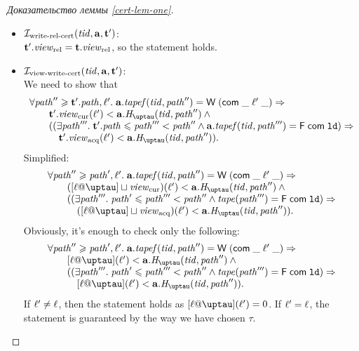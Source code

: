 \begin{proof}[Доказательство леммы \ref{cert-lem-one}]
\begin{itemize}
\begin{itemize}
        \item $\mathcal{I}_{\textup{\rm write-rel-cert}}(\mathit{tid}, \mathbf{a}, \mathbf{t}')$: \\
          $\mathbf{t}'.\mathit{view}_{\mathrm{rel}} = \mathbf{t}.\mathit{view}_{\mathrm{rel}}$, so the statement holds.

        \item $\mathcal{I}_{\textup{\rm view-write-cert}}(\mathit{tid}, \mathbf{a}, \mathbf{t}')$: \\
          We need to show that
          \[\begin{array}{l}
            \forall \cpath'' \ge \tT'.\cpath, \loc'. \;
              \aT.\tapef(\tId, \cpath'') = \tapeWrite{(\tapeWriteCommitted{\_}{\loc'}{\_})} \Rightarrow \\
          \quad \quad \tT'.\Rcur(\loc') < \aT.\tmap(\tId, \cpath'') \land {} \\
          \quad \quad ((\exists \cpath'''. \; \tT'.\cpath \le \cpath''' < \cpath'' \land 
                       \aT.\tapef(\tId, \cpath''') = \tapeFence{\Committed}{\LD}) \Rightarrow \\
          \quad \quad \quad \tT'.\Racq(\loc') < \aT.\tmap(\tId, \cpath'')).\\
          \end{array}\]
          Simplified:
          \[\begin{array}{l}
            \forall \cpath'' \ge \cpath', \loc'. \;
              \aT.\tapef(\tId, \cpath'') = \tapeWrite{(\tapeWriteCommitted{\_}{\loc'}{\_})} \Rightarrow \\
          \quad \quad ([\loc @ \tau] \sqcup \Rcur)(\loc') < \aT.\tmap(\tId, \cpath'') \land {} \\
          \quad \quad ((\exists \cpath'''. \; \cpath' \le \cpath''' < \cpath'' \land 
                       \tape(\cpath''') = \tapeFence{\Committed}{\LD}) \Rightarrow \\
          \quad \quad \quad ([\loc @ \tau] \sqcup \Racq)(\loc') < \aT.\tmap(\tId, \cpath'')).\\
          \end{array}\]
          Obviously, it's enough to check only the following:
          \[\begin{array}{l}
            \forall \cpath'' \ge \cpath', \loc'. \;
              \aT.\tapef(\tId, \cpath'') = \tapeWrite{(\tapeWriteCommitted{\_}{\loc'}{\_})} \Rightarrow \\
          \quad \quad [\loc @ \tau](\loc') < \aT.\tmap(\tId, \cpath'') \land {} \\
          \quad \quad ((\exists \cpath'''. \; \cpath' \le \cpath''' < \cpath'' \land 
                       \tape(\cpath''') = \tapeFence{\Committed}{\LD}) \Rightarrow \\
          \quad \quad \quad [\loc @ \tau](\loc') < \aT.\tmap(\tId, \cpath'')).\\
          \end{array}\]
          If $\ell' \not = \ell$, then the statement holds as $[\loc @ \tau](\loc') = 0$.
          If $\ell' = \ell$, the statement is guaranteed by the way we have chosen $\tau$.


\end{itemize}
\end{itemize}
\end{proof}
